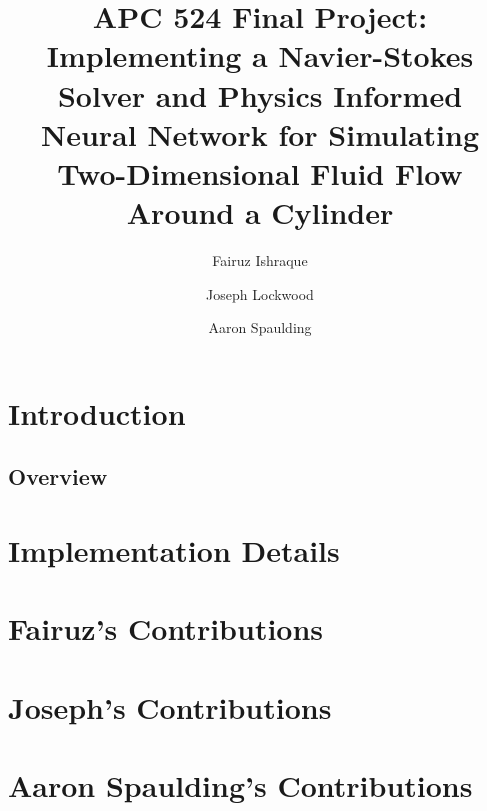\documentclass[11pt, letterpaper]{article}
\title{\titlefontlarge APC 524 Final Project:\\\titlefont Implementing a Navier-Stokes Solver and Physics Informed Neural Network for Simulating Two-Dimensional Fluid Flow Around a Cylinder}
\author[1]{Fairuz Ishraque}
\author[1]{Joseph Lockwood}
\author[2]{Aaron Spaulding}
\affil[1]{Department of Geosciences}
\affil[2]{Department of Civil and Environmental Engineering}
\date{}
\begin{document}
\maketitle
\newpage 
\tableofcontents

\newpage


\section{Introduction}

\subsection{Overview}


\section{Implementation Details}


\section{Fairuz's Contributions}


\section{Joseph's Contributions}


\newpage
\section{Aaron Spaulding's Contributions}


\newpage
\printbibliography
\end{document}
